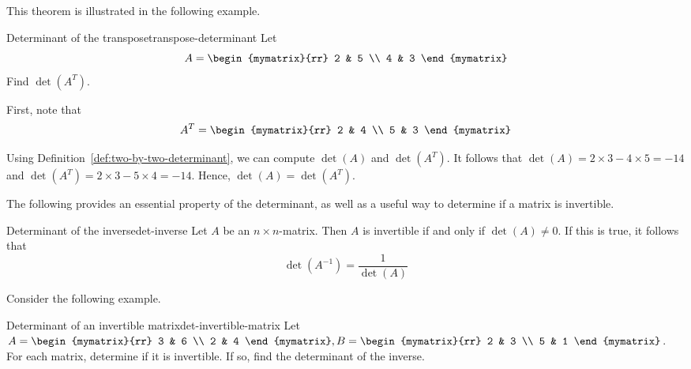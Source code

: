 This theorem is illustrated in the following example.

\begin{example}{Determinant of the transpose}{transpose-determinant}
  Let
  \begin{equation*}
    A
    =
    \begin{mymatrix}{rr}
      2 & 5 \\
      4 & 3
    \end{mymatrix}
  \end{equation*}
  Find $\det (A^T)$.
\end{example}

\begin{solution}
  First, note that 
  \begin{equation*}
    A^{T}
    =
    \begin{mymatrix}{rr}
      2 & 4 \\
      5 & 3
    \end{mymatrix}
  \end{equation*}

  Using Definition~\ref{def:two-by-two-determinant}, we can compute
  $\det (A)$ and $\det (A^T)$. It follows that
  $\det (A) = 2 \times 3 - 4 \times 5 = -14$ and
  $\det (A^T) = 2 \times 3 - 5 \times 4 = -14$.  Hence,
  $\det (A) = \det (A^T)$.
\end{solution}

The following provides an essential property of the determinant, as
well as a useful way to determine if a matrix is invertible.

\begin{theorem}{Determinant of the inverse}{det-inverse}
  Let $A$ be an $n \times n$-matrix. Then $A$ is invertible if and
  only if $\det(A) \neq 0$. If this is true, it follows that
  \begin{equation*}
    \det(A^{-1}) = \frac{1}{\det(A)}
  \end{equation*}
\end{theorem}

Consider the following example.

\begin{example}{Determinant of an invertible matrix}{det-invertible-matrix}
  Let $A = \begin{mymatrix}{rr}
    3 & 6 \\
    2 & 4 
  \end{mymatrix}, B = \begin{mymatrix}{rr}
    2 & 3 \\
    5 & 1
  \end{mymatrix}$. For each matrix, determine if it is invertible. If
  so, find the determinant of the inverse.
\end{example}

